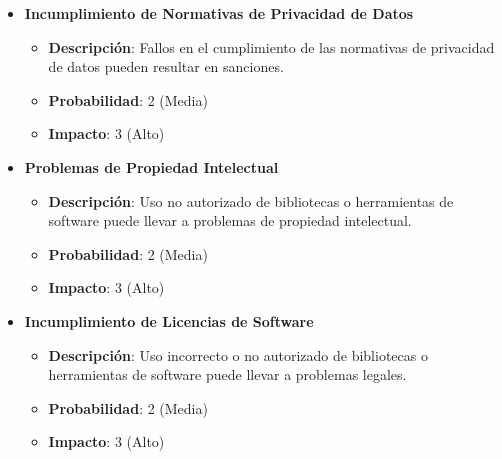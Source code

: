 \begin{itemize}
    \item \textbf{Incumplimiento de Normativas de Privacidad de Datos}
          \begin{itemize}
              \item \textbf{Descripción}: Fallos en el cumplimiento de las normativas de privacidad de datos pueden resultar en sanciones.
              \item \textbf{Probabilidad}: 2 (Media)
              \item \textbf{Impacto}: 3 (Alto)
          \end{itemize}

    \item \textbf{Problemas de Propiedad Intelectual}
          \begin{itemize}
              \item \textbf{Descripción}: Uso no autorizado de bibliotecas o herramientas de software puede llevar a problemas de propiedad intelectual.
              \item \textbf{Probabilidad}: 2 (Media)
              \item \textbf{Impacto}: 3 (Alto)
          \end{itemize}

    \item \textbf{Incumplimiento de Licencias de Software}
          \begin{itemize}
              \item \textbf{Descripción}: Uso incorrecto o no autorizado de bibliotecas o herramientas de software puede llevar a problemas legales.
              \item \textbf{Probabilidad}: 2 (Media)
              \item \textbf{Impacto}: 3 (Alto)
          \end{itemize}
\end{itemize}
